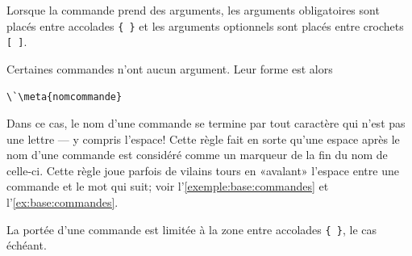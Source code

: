 Lorsque la commande prend des arguments, les arguments obligatoires
sont placés entre accolades \verb={ }= et les arguments optionnels
sont placés entre crochets \verb=[ ]=.

Certaines commandes n'ont aucun argument. Leur forme est alors
\begin{lstlisting}
\`\meta{nomcommande}
\end{lstlisting}
Dans ce cas, le nom d'une commande se termine par tout caractère qui
n'est pas une lettre --- y compris l'espace! Cette règle fait en sorte
qu'une espace après le nom d'une commande est considéré comme un
marqueur de la fin du nom de celle-ci. Cette règle joue parfois de
vilains tours en «avalant» l'espace entre une commande et le mot qui
suit; voir l'\autoref{exemple:base:commandes} et
l'\autoref{ex:base:commandes}.

La portée d'une commande est limitée à la zone entre accolades
\verb={ }=, le cas échéant.

